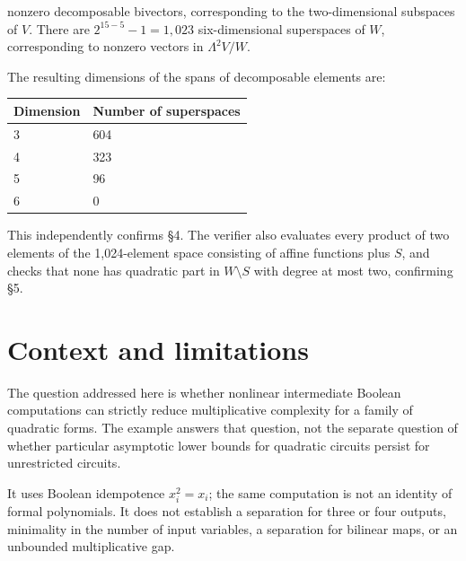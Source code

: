 nonzero decomposable bivectors, corresponding to the two-dimensional subspaces of $V$. There are $2^{15-5}-1=1,023$ six-dimensional superspaces of $W$, corresponding to nonzero vectors in $\Lambda^2V/W$.

The resulting dimensions of the spans of decomposable elements are:

\begin{center}\begin{tabular}{ll}\toprule
Dimension & Number of superspaces\\\midrule
3 & 604\\
4 & 323\\
5 & 96\\
6 & 0\\
\bottomrule\end{tabular}\end{center}

This independently confirms \S{}4. The verifier also evaluates every product of two elements of the 1,024-element space consisting of affine functions plus $S$, and checks that none has quadratic part in $W\setminus S$ with degree at most two, confirming \S{}5.

\section{Context and limitations}

The question addressed here is whether nonlinear intermediate Boolean computations can strictly reduce multiplicative complexity for a family of quadratic forms. The example answers that question, not the separate question of whether particular asymptotic lower bounds for quadratic circuits persist for unrestricted circuits.

It uses Boolean idempotence $x_i^2=x_i$; the same computation is not an identity of formal polynomials. It does not establish a separation for three or four outputs, minimality in the number of input variables, a separation for bilinear maps, or an unbounded multiplicative gap.

